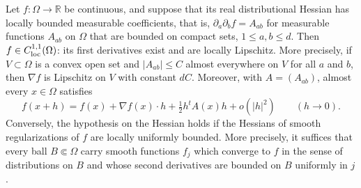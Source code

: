\begin{proposition}\label{prop:bounded-hessian-taylor}
Let $f\colon\Omega\to\mathbb R$ be continuous, and suppose that its real distributional Hessian has locally bounded measurable coefficients, that is, $\partial_a\partial_bf=A_{ab}$ for measurable functions $A_{ab}$ on $\Omega$ that are bounded on compact sets, $1\leq a,b\leq d$. Then $f\in C^{1,1}_{\mathrm{loc}}(\Omega)$: its first derivatives exist and are locally Lipschitz. More precisely, if $V\subset\Omega$ is a convex open set and $|A_{ab}|\leq C$ almost everywhere on $V$ for all $a$ and $b$, then $\nabla f$ is Lipschitz on $V$ with constant $dC$. Moreover, with $A=(A_{ab})$, almost every $x\in\Omega$ satisfies
\[
 f(x+h)=f(x)+\nabla f(x)\cdot h+\tfrac12h^tA(x)h+o(|h|^2)\qquad(h\to0).
\]
Conversely, the hypothesis on the Hessian holds if the Hessians of smooth regularizations of $f$ are locally uniformly bounded. More precisely, it suffices that every ball $B\Subset\Omega$ carry smooth functions $f_j$ which converge to $f$ in the sense of distributions on $B$ and whose second derivatives are bounded on $B$ uniformly in $j$.
\end{proposition}

